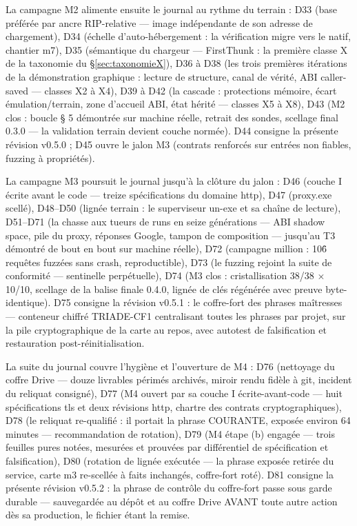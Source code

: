 La campagne M2 alimente ensuite le journal au rythme du terrain : D33 (base préférée
par ancre RIP-relative — image indépendante de son adresse de chargement), D34
(échelle d’auto-hébergement : la vérification migre vers le natif, chantier m7), D35
(sémantique du chargeur — FirstThunk : la première classe X de la taxonomie du
§\ref{sec:taxonomieX}), D36 à D38 (les trois premières itérations de la démonstration
graphique : lecture de structure, canal de vérité, ABI caller-saved — classes X2 à X4),
D39 à D42 (la cascade : protections mémoire, écart émulation/terrain, zone d’accueil
ABI, état hérité — classes X5 à X8), D43 (M2 clos : boucle § 5 démontrée sur machine
réelle, retrait des sondes, scellage final 0.3.0 — la validation terrain devient
couche normée). D44 consigne la présente révision v0.5.0 ; D45 ouvre le jalon M3
(contrats renforcés sur entrées non fiables, fuzzing à propriétés).

La campagne M3 poursuit le journal jusqu'à la clôture du jalon : D46 (couche I écrite
avant le code — treize spécifications du domaine http), D47 (proxy.exe scellé),
D48–D50 (lignée terrain : le superviseur un-exe et sa chaîne de lecture), D51–D71 (la
chasse aux tueurs de runs en seize générations — ABI shadow space, pile du proxy,
réponses Google, tampon de composition — jusqu'au T3 démontré de bout en bout sur
machine réelle), D72 (campagne million : 10\^6 requêtes fuzzées sans crash, reproductible),
D73 (le fuzzing rejoint la suite de conformité — sentinelle perpétuelle), D74 (M3 clos :
cristallisation 38/38 $\times$ 10/10, scellage de la balise finale 0.4.0, lignée de clés
régénérée avec preuve byte-identique). D75 consigne la révision v0.5.1 : le
coffre-fort des phrases maîtresses — conteneur chiffré TRIADE-CF1 centralisant toutes
les phrases par projet, sur la pile cryptographique de la carte au repos, avec autotest
de falsification et restauration post-réinitialisation.

La suite du journal couvre l'hygiène et l'ouverture de M4 : D76 (nettoyage du coffre
Drive — douze livrables périmés archivés, miroir rendu fidèle à git, incident du reliquat
consigné), D77 (M4 ouvert par sa couche I écrite-avant-code — huit spécifications
tls et deux révisions http, chartre des contrats cryptographiques), D78 (le reliquat
re-qualifié : il portait la phrase COURANTE, exposée environ 64 minutes — recommandation
de rotation), D79 (M4 étape (b) engagée — trois feuilles pures notées, mesurées et
prouvées par différentiel de spécification et falsification), D80 (rotation de lignée
exécutée — la phrase exposée retirée du service, carte m3 re-scellée à faits inchangés,
coffre-fort roté). D81 consigne la présente révision v0.5.2 : la phrase de contrôle du
coffre-fort passe sous garde durable — sauvegardée au dépôt et au coffre Drive AVANT
toute autre action dès sa production, le fichier étant la remise.

